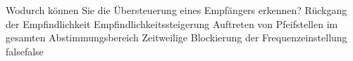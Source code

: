     {Wodurch können Sie die Übersteuerung eines Empfängers erkennen?}
    {Rückgang der Empfindlichkeit}
    {Empfindlichkeitssteigerung}
    {Auftreten von Pfeifstellen im gesamten Abstimmungsbereich}
    {Zeitweilige Blockierung der Frequenzeinstellung}
    {false}{false}